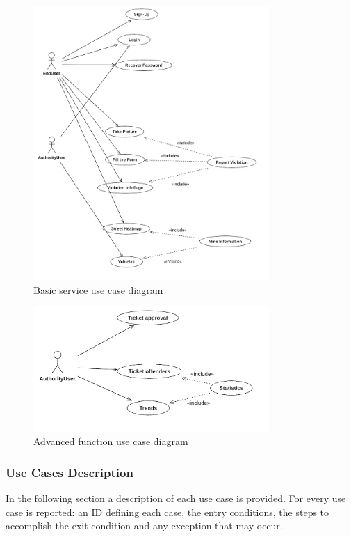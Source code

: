  \begin{figure}[H]
		\centering
      \includegraphics[width=0.8\textwidth]{Images/BasicServiceUseCase.png}
      \caption{Basic service use case diagram}   \label{fig:BasicService}
\end{figure}

 \begin{figure}[H]
		\centering
      \includegraphics[width=0.8\textwidth]{Images/AdvancedFUnUseCase.png}
      \caption{Advanced function use case diagram}   \label{fig:AdvancedFunction}
\end{figure}


\subsubsection{Use Cases Description}
In the following section a description of each use case is provided. For every use case is reported: an ID defining each case, the entry conditions, the steps to accomplish the exit condition and any exception that may occur. \\

